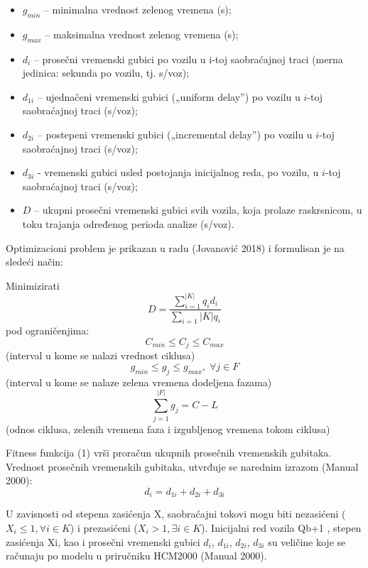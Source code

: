 \begin{itemize}
    \item $g_{min}$ -- minimalna vrednost zelenog vremena (s);
    \item $g_{max}$ -- maksimalna vrednost zelenog vremena (s);
    \item $d_i$ -- prosečni vremenski gubici po vozilu u i-toj saobraćajnoj traci (merna jedinica: sekunda po vozilu, tj. s/voz);
    \item $d_{1i}$ -- ujednačeni vremenski gubici („uniform delay”) po vozilu u $i$-toj saobraćajnoj traci (s/voz);
    \item $d_{2i}$ -- postepeni vremenski gubici („incremental delay”) po vozilu u $i$-toj saobraćajnoj traci (s/voz);
    \item $d_{3i}$ - vremenski gubici usled postojanja inicijalnog reda, po vozilu, u $i$-toj saobraćajnoj traci (s/voz);
    \item $D$ -- ukupni prosečni vremenski gubici svih vozila, koja prolaze raskrsnicom, u toku trajanja određenog perioda analize (s/voz).
\end{itemize}

Optimizacioni problem je prikazan u radu (Jovanović 2018) i formulisan je na sledeći način:

Minimizirati
\begin{equation}
    D = \frac{\sum_{i=1}^{|K|} q_i d_i}{\sum_{i=1}{|K|} q_i}
\end{equation}
pod ograničenjima:
\begin{equation}
    C_{min} \leq C_j \leq C_{max}
\end{equation}
(interval u kome se nalazi vrednost ciklusa)
\begin{equation}
    g_{min} \leq g_j \leq g_{max}, \; \forall j \in F
\end{equation}
(interval u kome se nalaze zelena vremena dodeljena fazama)
\begin{equation}
    \sum_{j=1}^{|F|} g_j = C-L
\end{equation}
(odnos  ciklusa, zelenih vremena faza i izgubljenog vremena tokom ciklusa)

Fitness funkcija (1) vrši proračun ukupnih prosečnih vremenskih gubitaka. Vrednost prosečnih vremenskih gubitaka, utvrđuje se narednim izrazom (Manual 2000):
\begin{equation*}
    d_i = d_{1i} + d_{2i} + d_{3i}
\end{equation*}

U zavisnosti od stepena zasićenja X, saobraćajni tokovi mogu biti nezasićeni ($X_i \leq 1, \forall i \in K$) i prezasićeni ($X_i > 1, \exists i \in K$). Inicijalni red vozila Qb+1 , stepen zasićenja Xi, kao i prosečni vremenski gubici $d_i$, $d_{1i}$, $d_{2i}$, $d_{3i}$ su veličine koje se računaju po modelu u priručniku HCM2000 (Manual 2000).

